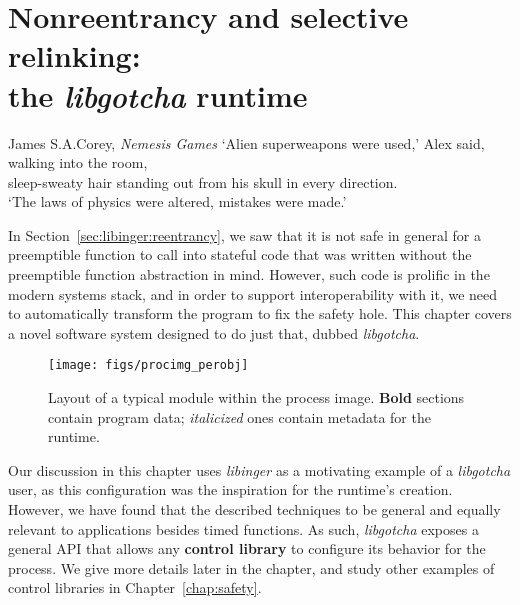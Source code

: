 \chapter{Nonreentrancy and selective relinking: \\ the \textit{libgotcha} runtime}
\label{chap:libgotcha}

\ifdefined\chapquotes
\vspace{-1in}
\begin{chapquote}[1.5in]{James S.\@ A.\@ Corey, \textit{Nemesis Games}}
`Alien superweapons were used,' Alex said, walking into the room, \\
sleep-sweaty hair standing out from his skull in every direction. \\
`The laws of physics were altered, mistakes were made.'
\end{chapquote}
\fi

In Section~\ref{sec:libinger:reentrancy}, we saw that it is not safe in general for a
preemptible function to call into stateful code that was written without the
preemptible function abstraction in mind.  However, such code is prolific in the
modern systems stack, and in order to support interoperability with it, we need to
automatically transform the program to fix the safety hole.  This chapter covers a
novel software system designed to do just that, dubbed \textit{libgotcha}.

\begin{figure}
\begin{center}
\texttt{[image: figs/procimg\_perobj]}
\end{center}
\caption{Layout of a typical module within the process image.  \textbf{Bold} sections
contain program data; \textit{italicized} ones contain metadata for the runtime.}
\label{fig:procimgobj}
\end{figure}

\begin{swallowsections}

\end{swallowsections}
\hspace{-2em}
Our discussion in this chapter uses \textit{libinger} as a motivating example of a
\textit{libgotcha} user, as this configuration was the inspiration for the runtime's
creation.  However, we have found that the described techniques to be general and
equally relevant to applications besides timed functions.  As such,
\textit{libgotcha} exposes a general API that allows any \textbf{control library} to
configure its behavior for the process.  We give more details later in the chapter,
and study other examples of control libraries in Chapter~\ref{chap:safety}.


